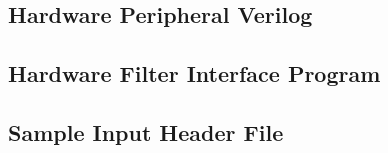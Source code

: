 \documentclass[conference]{IEEEtran}
\begin{document}
\subsection{Hardware Peripheral Verilog}

\subsection{Hardware Filter Interface Program}

\subsection{Sample Input Header File}

\end{document}
